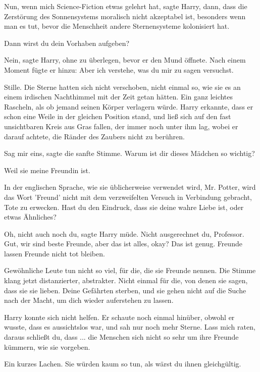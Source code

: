 \glqq{}Nun, wenn mich Science-Fiction etwas gelehrt hat\grqq{}, sagte Harry,
\glqq{}dann, dass die Zerstörung des Sonnensystems moralisch nicht akzeptabel
ist, besonders wenn man es tut, bevor die Menschheit andere Sternensysteme
kolonisiert hat.\grqq{}

\glqq{}Dann wirst du dein Vorhaben aufgeben?\grqq{}

\glqq{}Nein\grqq{}, sagte Harry, ohne zu überlegen, bevor er den Mund öffnete.
Nach einem Moment fügte er hinzu: \glqq{}Aber ich verstehe, was du mir zu sagen
versuchst.\grqq{}

Stille. Die Sterne hatten sich nicht verschoben, nicht einmal so, wie sie es an
einem irdischen Nachthimmel mit der Zeit getan hätten. Ein ganz leichtes
Rascheln, als ob jemand seinen Körper verlagern würde. Harry erkannte, dass er
schon eine Weile in der gleichen Position stand, und ließ sich auf den fast
unsichtbaren Kreis aus Gras fallen, der immer noch unter ihm lag, wobei er
darauf achtete, die Ränder des Zaubers nicht zu berühren.

\glqq{}Sag mir eins\grqq{}, sagte die sanfte Stimme. \glqq{}Warum ist dir dieses
Mädchen so wichtig?\grqq{}

\glqq{}Weil sie meine Freundin ist.\grqq{}

\glqq{}In der englischen Sprache, wie sie üblicherweise verwendet wird, Mr.
Potter, wird das Wort 'Freund' nicht mit dem verzweifelten Versuch in Verbindung
gebracht, Tote zu erwecken. Hast du den Eindruck, dass sie deine wahre Liebe
ist, oder etwas Ähnliches?\grqq{}

\glqq{}Oh, nicht auch noch du\grqq{}, sagte Harry müde. \glqq{}Nicht ausgerechnet
du, Professor. Gut, wir sind beste Freunde, aber das ist alles, okay? Das ist
genug. Freunde lassen Freunde nicht tot bleiben.\grqq{}

\glqq{}Gewöhnliche Leute tun nicht so viel, für die, die sie Freunde
nennen.\grqq{} Die Stimme klang jetzt distanzierter, abstrakter. \glqq{}Nicht
einmal für die, von denen sie sagen, dass sie sie lieben. Deine Gefährten
sterben, und sie gehen nicht auf die Suche nach der Macht, um dich wieder
auferstehen zu lassen.\grqq{}

Harry konnte sich nicht helfen. Er schaute noch einmal hinüber, obwohl er
wusste, dass es aussichtslos war, und sah nur noch mehr Sterne. \glqq{}Lass mich
raten, daraus schließt du, dass ... die Menschen sich nicht so sehr um ihre
Freunde kümmern, wie sie vorgeben.\grqq{}

Ein kurzes Lachen. \glqq{}Sie würden kaum so tun, als wärst du ihnen
gleichgültig.\grqq{}

